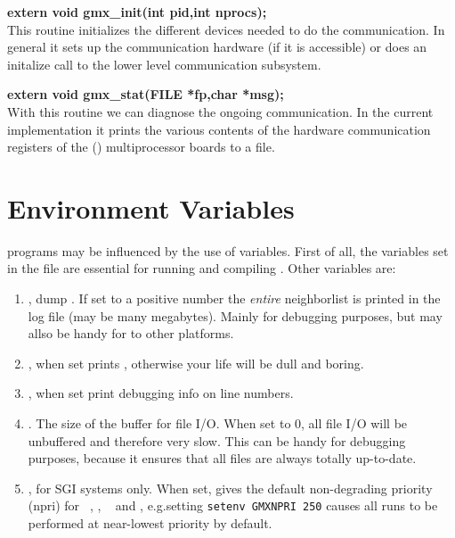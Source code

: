 \smallskip

{\bf extern void gmx\_init(int pid,int nprocs);}\\
This routine initializes the different devices needed to do the communication. In general it sets up the communication hardware (if it is accessible) or does an initalize call to the lower level communication subsystem.

\smallskip

{\bf extern void gmx\_stat(FILE *fp,char *msg);}\\
With this routine we can diagnose the ongoing communication. In the current implementation it prints the various contents of the hardware communication  registers of the (\intel) multiprocessor boards to a file.


\section{Environment Variables}
{\gromacs} programs may be influenced by the use of  
variables. First of all, the variables set in the  file
are essential for running and compiling {\gromacs}. Other variables are:
\begin{enumerate}
\item	{}, dump . 
	If set to a positive number the {\em entire}
	neighborlist is printed in the log file (may be many megabytes).
	Mainly for debugging purposes, but may allso be handy for
	 to other platforms.
\item	{}, when set prints , otherwise
	your {\gromacs} life will be dull and boring.
\item	{}, when set print debugging info on line numbers.
\item	{}. The size of the buffer for file I/O. When set
	to 0, all file I/O will be unbuffered and therefore very slow.
	This can be handy for debugging purposes, because it ensures
	that all files are always totally up-to-date.
\item   {}, for SGI systems only. When set, gives the
	default non-degrading priority (npri) for {\tt
	}, {\tt {}}, {\tt
	} and {\tt {}},
	e.g.\@ setting \verb'setenv GMXNPRI 250' causes all
	runs to be performed at near-lowest priority by default.
\end{enumerate}

